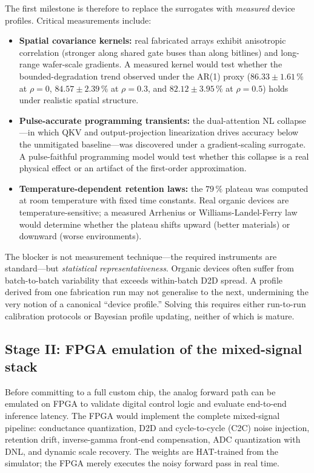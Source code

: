 The first milestone is therefore to replace the surrogates with \emph{measured} device profiles.  Critical measurements include:
\begin{itemize}[leftmargin=1.4em]
    \item \textbf{Spatial covariance kernels:} real fabricated arrays exhibit anisotropic correlation (stronger along shared gate buses than along bitlines) and long-range wafer-scale gradients.  A measured kernel would test whether the bounded-degradation trend observed under the AR(1) proxy ($86.33\pm1.61\,\%$ at $\rho=0$, $84.57\pm2.39\,\%$ at $\rho=0.3$, and $82.12\pm3.95\,\%$ at $\rho=0.5$) holds under realistic spatial structure.
    \item \textbf{Pulse-accurate programming transients:} the dual-attention NL collapse---in which QKV and output-projection linearization drives accuracy below the unmitigated baseline---was discovered under a gradient-scaling surrogate.  A pulse-faithful programming model would test whether this collapse is a real physical effect or an artifact of the first-order approximation.
    \item \textbf{Temperature-dependent retention laws:} the $79\,\%$ plateau was computed at room temperature with fixed time constants.  Real organic devices are temperature-sensitive; a measured Arrhenius or Williams-Landel-Ferry law would determine whether the plateau shifts upward (better materials) or downward (worse environments).
\end{itemize}
The blocker is not measurement technique---the required instruments are standard---but \emph{statistical representativeness}.  Organic devices often suffer from batch-to-batch variability that exceeds within-batch D2D spread.  A profile derived from one fabrication run may not generalise to the next, undermining the very notion of a canonical ``device profile.''  Solving this requires either run-to-run calibration protocols or Bayesian profile updating, neither of which is mature.

\subsection{Stage II: FPGA emulation of the mixed-signal stack}
\label{subsec:stage-fpga}

Before committing to a full custom chip, the analog forward path can be emulated on FPGA to validate digital control logic and evaluate end-to-end inference latency.  The FPGA would implement the complete mixed-signal pipeline: conductance quantization, D2D and cycle-to-cycle (C2C) noise injection, retention drift, inverse-gamma front-end compensation, ADC quantization with DNL, and dynamic scale recovery.  The weights are HAT-trained from the simulator; the FPGA merely executes the noisy forward pass in real time.

